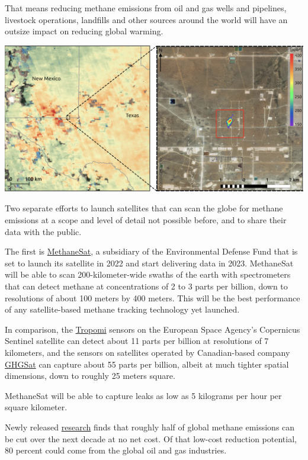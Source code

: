 \documentclass[
]{book}
\begin{document}
That means reducing methane emissions from oil and gas wells and pipelines, livestock operations, landfills and other sources around the world will have an outsize impact on reducing global warming.

\includegraphics{fig/ESA_Methane_Spotting.png}

Two separate efforts to launch satellites that can scan the globe for methane emissions at a scope and level of detail not possible before, and to share their data with the public.

The first is \href{https://www.methanesat.org/}{MethaneSat}, a subsidiary of the Environmental Defense Fund that is set to launch its satellite in 2022 and start delivering data in 2023. MethaneSat will be able to scan 200-kilometer-wide swaths of the earth with spectrometers that can detect methane at concentrations of 2 to 3 parts per billion, down to resolutions of about 100 meters by 400 meters.
This will be the best performance of any satellite-based methane tracking technology yet launched.

In comparison, the \href{http://www.tropomi.eu/data-products/methane}{Tropomi} sensors on the European Space Agency's Copernicus Sentinel satellite can detect about 11 parts per billion at resolutions of 7 kilometers, and the sensors on satellites operated by Canadian-based company \href{https://www.ghgsat.com/pulse/}{GHGSat} can capture about 55 parts per billion, albeit at much tighter spatial dimensions, down to roughly 25 meters square.

MethaneSat will be able to capture leaks as low as 5 kilograms per hour per square kilometer.

Newly released \href{https://www.edf.org/media/study-cutting-methane-emissions-quickly-could-slow-climate-warming-rate-30}{research} finds that roughly half of global methane emissions can be cut over the next decade at no net cost. Of that low-cost reduction potential, 80 percent could come from the global oil and gas industries.
\end{document}
